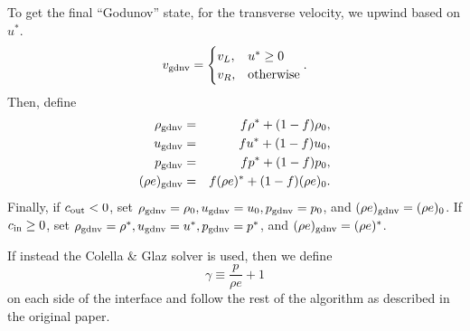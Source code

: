 To get the final ``Godunov'' state, for the transverse velocity, we
upwind based on $u^*$.
\begin{equation}
v_{\rm gdnv} =
\begin{cases}
v_L, & u^* \ge 0 \\
v_R, & {\rm otherwise}
\end{cases}.
\end{equation}
Then, define
\begin{eqnarray}
\rho_{\rm gdnv} &=& f\rho^* + (1-f)\rho_0, \\
u_{\rm gdnv} &=& f u^* + (1-f)u_0, \\
p_{\rm gdnv} &=& f p^* + (1-f)p_0, \\
(\rho e)_{\rm gdnv} &=& f(\rho e)^* + (1-f)(\rho e)_0.
\end{eqnarray}
Finally, if $c_{\rm out} < 0$, set $\rho_{\rm gdnv}=\rho_0, u_{\rm
  gdnv}=u_0, p_{\rm gdnv}=p_0$, and $(\rho e)_{\rm gdnv}=(\rho e)_0$.
If $c_{\rm in}\ge 0$, set $\rho_{\rm gdnv}=\rho^*, u_{\rm gdnv}=u^*,
p_{\rm gdnv}=p^*$, and $(\rho e)_{\rm gdnv}=(\rho e)^*$.


If instead the Colella \& Glaz solver is used, then we define
\begin{equation}
  \gamma \equiv \frac{p}{\rho e} + 1
\end{equation}
on each side of the interface and follow the rest of the algorithm as
described in the original paper.

